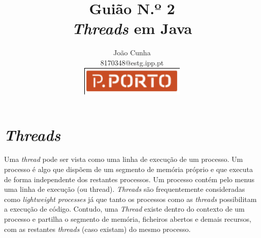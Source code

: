 \documentclass[11pt, arial]{article}
\title{%
  Guião N.º 2 \\[0.5cm]
  \textbf{\textit{Threads} em Java}
}
\author{João Cunha \\8170348@estg.ipp.pt \\\includegraphics[width=5cm]{scrot}}
\begin{document}
  \maketitle
  \section{\textit{Threads}}
  Uma \textit{thread} pode ser vista como uma linha de execução de um processo.
  Um processo é algo que dispõem de um segmento de memória próprio e que executa
  de forma independente dos restantes processos. Um processo contém pelo menus uma
  linha de execução (ou thread). \textit{Threads} são frequentemente consideradas como
  \textit{lightweight processes} já que tanto os processos como as \textit{threads}
  possibilitam a execução de código. Contudo, uma \textit{Thread} existe dentro do contexto
  de um processo e partilha o segmento de memória, ficheiros abertos e demais recursos, com as
  restantes \textit{threads} (caso existam) do mesmo processo.

  
\end{document}

